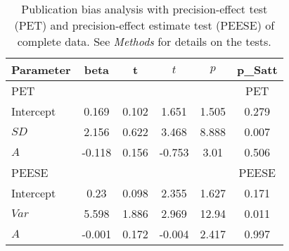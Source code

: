 \begin{table}[ht]
\centering
\caption{Publication bias analysis with precision-effect test (PET) and precision-effect estimate test (PEESE) of complete data. See \textit{Methods} for details on the tests.} 
\label{tab:PET-PEESE}
\begin{tabular}{lccccc}
  \hline
Parameter & beta & t & $t$ & $p$ & p_Satt \\ 
  \hline
PET &  &  &  &  & PET \\ 
  Intercept & 0.169 & 0.102 & 1.651 & 1.505 & 0.279 \\ 
  $SD$ & 2.156 & 0.622 & 3.468 & 8.888 & 0.007 \\ 
  $A$ & -0.118 & 0.156 & -0.753 & 3.01 & 0.506 \\ 
  PEESE &  &  &  &  & PEESE \\ 
  Intercept & 0.23 & 0.098 & 2.355 & 1.627 & 0.171 \\ 
  $Var$ & 5.598 & 1.886 & 2.969 & 12.94 & 0.011 \\ 
  $A$ & -0.001 & 0.172 & -0.004 & 2.417 & 0.997 \\ 
   \hline
\end{tabular}
\end{table}
